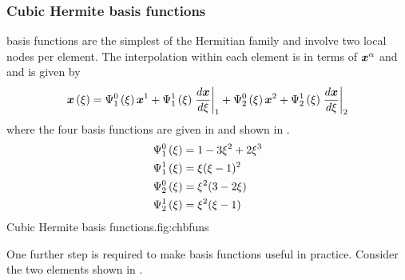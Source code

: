 \subsubsection{Cubic Hermite basis functions}

\Cubicherm basis functions are the simplest of the Hermitian family and
involve two local nodes per element. The interpolation within each element is
in terms of $\nodept{\vect{x}}{\alpha}$ and 
and is given by 
\begin{equation}
  \fnof{\vect{x}}{\xi}=\chbfn{1}{0}{\xi}\nodept{\vect{x}}{1}+\chbfn{1}{1}{\xi}
  \evalat{\dby{\vect{x}}{\xi}}{1}+\chbfn{2}{0}{\xi}\nodept{\vect{x}}{2}+
  \chbfn{2}{1}{\xi}\evalat{\dby{\vect{x}}{\xi}}{2}
  \label{eqn:chxiinterpolation}
\end{equation}
where the four \onedal \cubicherm basis functions are given in 
 and shown in .
\begin{equation}
  \begin{split}
       \Psi_{1}^{0} \left( \xi \right)   &= 1-3\xi^{2}+2\xi^{3} \\
       \Psi_{1}^{1} \left( \xi \right)   &= \xi(\xi-1)^{2} \\
       \Psi_{2}^{0} \left( \xi \right)   &= \xi^{2}(3-2\xi) \\
       \Psi_{2}^{1} \left( \xi \right)   &= \xi^{2}(\xi-1) 
  \end{split}
  \label{eqn:chbfuns}
\end{equation}
{Cubic Hermite basis functions.}{fig:chbfuns}

One further step is required to make \cubicherm basis functions useful in
practice.  Consider the two \cubicherm elements shown in
.


